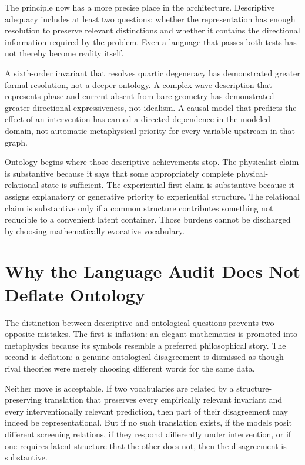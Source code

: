 The principle now has a more precise place in the architecture. Descriptive adequacy includes at least two questions: whether the representation has enough resolution to preserve relevant distinctions and whether it contains the directional information required by the problem. Even a language that passes both tests has not thereby become reality itself.

A sixth-order invariant that resolves quartic degeneracy has demonstrated greater formal resolution, not a deeper ontology. A complex wave description that represents phase and current absent from bare geometry has demonstrated greater directional expressiveness, not idealism. A causal model that predicts the effect of an intervention has earned a directed dependence in the modeled domain, not automatic metaphysical priority for every variable upstream in that graph.

Ontology begins where those descriptive achievements stop. The physicalist claim is substantive because it says that some appropriately complete physical-relational state is sufficient. The experiential-first claim is substantive because it assigns explanatory or generative priority to experiential structure. The relational claim is substantive only if a common structure contributes something not reducible to a convenient latent container. Those burdens cannot be discharged by choosing mathematically evocative vocabulary.

\section{Why the Language Audit Does Not Deflate Ontology}

The distinction between descriptive and ontological questions prevents two opposite mistakes. The first is inflation: an elegant mathematics is promoted into metaphysics because its symbols resemble a preferred philosophical story. The second is deflation: a genuine ontological disagreement is dismissed as though rival theories were merely choosing different words for the same data.

Neither move is acceptable. If two vocabularies are related by a structure-preserving translation that preserves every empirically relevant invariant and every interventionally relevant prediction, then part of their disagreement may indeed be representational. But if no such translation exists, if the models posit different screening relations, if they respond differently under intervention, or if one requires latent structure that the other does not, then the disagreement is substantive.


